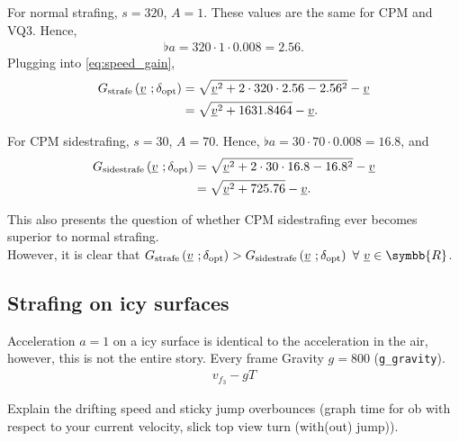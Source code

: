 For normal strafing, $s = 320$, $A = 1$. These values are the same for CPM and VQ3. Hence,
\begin{align*}
\flat{a} = 320\cdot 1\cdot 0.008 = 2.56.
\end{align*}
Plugging into \eqref{eq:speed_gain},
\begin{align*}
G_{\text{strafe}}\left(\flat{v}\ ;\delta_{\opt} \right) &= \sqrt{\flat{v}^2 + 2\cdot 320 \cdot 2.56 - 2.56^2} - \flat{v}\\
&= \sqrt{\flat{v}^2 + 1631.8464} - \flat{v}.
\end{align*}

For CPM sidestrafing, $s = 30$, $A = 70$. Hence, $\flat{a} = 30\cdot 70\cdot 0.008 = 16.8$, and
\begin{align*}
G_{\text{sidestrafe}}\left(\flat{v}\ ;\delta_{\opt} \right) &= \sqrt{\flat{v}^2 + 2\cdot 30 \cdot 16.8 - 16.8^2} - \flat{v}\\
&= \sqrt{\flat{v}^2 + 725.76} - \flat{v}.
\end{align*}

This also presents the question of whether CPM sidestrafing ever becomes superior to normal strafing.\\
However, it is clear that $G_{\text{strafe}}\left(\flat{v}\ ;\delta_{\opt} \right) > G_{\text{sidestrafe}}\left(\flat{v}\ ;\delta_{\opt} \right)\ \forall\ \flat{v} \in \symbb{R}$.


\subsection{Strafing on icy surfaces}
\label{sec:icy}
Acceleration $a = 1$ on a icy surface is identical to the acceleration in the air, however, this is not the entire story. Every frame Gravity $g = 800$ (\texttt{g\_gravity}).
\begin{align*}
v_{f_3} - gT
\end{align*}

Explain the drifting speed and sticky jump overbounces (graph time for ob with respect to your current velocity, slick top view turn (with(out) jump)).


